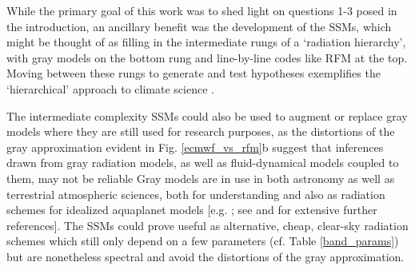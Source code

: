 \documentclass{ametsoc}
\newcommand{\eqnref}[1]{(\ref{#1})}
\newcommand{\comment}[1]{\textcolor{blue}{[{#1}]}}
\newcommand{\kg}{\ensuremath{\mathrm{kg}}}
\newcommand{\meter}{\ensuremath{\mathrm{m}}}
\newcommand{\Wmsq}{\ensuremath{\mathrm{W/m^2}}}
\newcommand{\htwo}{\ensuremath{\mathrm{H_2O}}}
\newcommand{\wv}{\ensuremath{\widetilde{\nu}}}
\newcommand{\WVP}{\ensuremath{\mathrm{WVP}}}
\newcommand{\kapparot}{\ensuremath{\kappa_{\mathrm{rot}}}}
\newcommand{\lrot}{\ensuremath{l_\mathrm{rot}}}
\newcommand{\rot}{\ensuremath{\textbf{rot}}}
\begin{document}
While the primary goal of this work was to shed light on questions 1-3 posed in the introduction, an ancillary benefit was the development of the SSMs, which might be thought of as filling in the intermediate rungs of a `radiation hierarchy', with gray models on the bottom rung and line-by-line codes like RFM at the top. Moving between these rungs to generate and test hypotheses exemplifies the `hierarchical' approach to climate science \citep{maher2019,jeevanjee2017a,polvani2017, held2005, hoskins1983,schneider1974}. 


The intermediate complexity  SSMs  could also be used  to augment or replace gray models where they are still used for research purposes, as the distortions of the gray approximation evident  in Fig. \ref{ecmwf_vs_rfm}b suggest that inferences drawn from gray radiation models, as well as fluid-dynamical models coupled to them, may not be reliable \citep[e.g.][. Also note that the gray model in Fig. \ref{ecmwf_vs_rfm}b,  tuned to exhibit the same 170 \Wmsq\ column-integrated cooling as RFM, also yields an OLR of 170 \Wmsq, which  is a serious underestimate of RFM's OLR value of  325 \Wmsq.]{tan2019} Gray models are in use in both astronomy \citep[e.g.][]{parmentier2014,rauscher2012,robinson2012,heng2011} as well as terrestrial atmospheric sciences, both for understanding \citep{hu2019,vallis2015} and also as radiation schemes for idealized aquaplanet models [e.g. \cite{frierson2006};  see  \cite{maher2019} and  \cite{jeevanjee2017a} for extensive further references]. The SSMs could prove useful as alternative, cheap, clear-sky radiation schemes which still only depend on a few parameters (cf. Table \ref{band_params}) but are nonetheless spectral  and avoid the distortions of the gray approximation.
\end{document}
